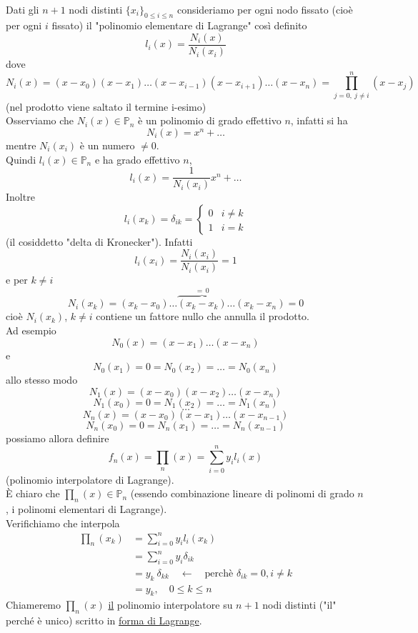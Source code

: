 \documentclass[12pt]{article}
\begin{document}
\\
Dati gli $n+1$ nodi distinti $\{ x_i \}_{0 \leq i \leq n}$ consideriamo per ogni nodo fissato (cioè per ogni $i$ fissato) il "polinomio elementare di Lagrange" così definito
\[
l_i(x) = \frac{N_i(x)}{N_i(x_i)}
\]
dove
\[
N_i(x) = (x-x_0)(x-x_1) \dotso (x-x_{i-1})(x-x_{i+1}) \dotso (x-x_n) = \prod_{j=0, \ j\neq i}^n (x-x_j)
\]
(nel prodotto viene saltato il termine i-esimo)\\
Osserviamo che $N_i(x) \in \mathbb{P}_n$ è un polinomio di grado effettivo $n$, infatti si ha
\[N_i(x)=x^n+\dotso\]
mentre $N_i(x_i)$ è un numero $\ne 0$.\\
Quindi $l_i(x) \in \mathbb{P}_n$ e ha grado effettivo $n$,
\[l_i(x) = \frac{1}{N_i(x_i)}x^n+\dotso\]
Inoltre
\[l_i(x_k) = \delta_{ik} =
\begin{cases}
0 & i\ne k \\
1 & i=k 
\end{cases}\]
(il cosiddetto "delta di Kronecker"). Infatti
\[l_i(x_i) = \frac{N_i(x_i)}{N_i(x_i)} = 1\]
e per $k\ne i$
\[N_i(x_k) = (x_k-x_0)\dotso \overbrace{(x_k-x_k)}^{=\,0} \dotso (x_k-x_n) = 0\]
cioè $N_i (x_k)$,  $k \neq i$ contiene un fattore nullo che annulla il prodotto.\\
Ad esempio 
\[
N_0 (x) = (x-x_1) \dotso (x-x_n)
\]
e 
\[
N_0(x_1) = 0 = N_0(x_2) = \dotso = N_0(x_n)
\]
allo stesso modo
\[ N_1(x) = (x-x_0)(x-x_2) \dotso (x-x_n) \]
\[ N_1(x_0) = 0 = N_1(x_2) = \dotso = N_1(x_n) \]
\[ \dotso \]
\[ N_n(x) = (x-x_0)(x-x_1) \dotso (x-x_{n-1}) \]
\[ N_n(x_0) = 0 = N_n(x_1) = \dotso = N_n(x_{n-1}) \]
possiamo allora definire
\[ f_n(x) = \prod_n(x) = \sum_{i=0}^n y_i l_i(x) \]
(polinomio interpolatore di Lagrange).\\
È chiaro che $\prod_n(x) \in \mathbb{P}_n$ (essendo combinazione lineare di polinomi di grado $n$, i polinomi elementari di Lagrange).\\
Verifichiamo che interpola
\[
\begin{split}
\prod _n (x_k) & = \sum_{i=0}^n y_i l_i (x_k) \\
& = \sum_{i=0}^n y_i \delta_{ik} \\
& = y_k \ \delta_{kk} \quad \longleftarrow \quad \text{perchè } \delta_{ik}=0, i \ne k\\
& = y_k, \quad 0 \leq k \leq n
\end{split}
\]
Chiameremo $\prod_n(x)$ \underline{il} polinomio interpolatore su $n+1$ nodi distinti ("il" perché è unico) scritto in \underline{forma di Lagrange}.\\\\
\end{document}
